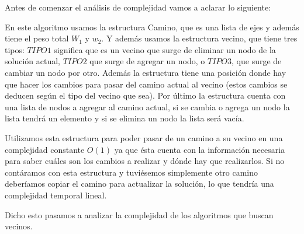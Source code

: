 Antes de comenzar el análisis de complejidad vamos a aclarar lo siguiente:

En este algoritmo usamos la estructura Camino, que es una lista de ejes y además tiene el peso total $W_1$ y $w_2$. Y además usamos la estructura vecino, que tiene tres tipos: $TIPO1$ significa que es un vecino que surge de eliminar un nodo de la solución actual, $TIPO2$ que surge de agregar un nodo, o $TIPO3$, que surge de cambiar un nodo por otro. Además la estructura tiene una posición donde hay que hacer los cambios para pasar del camino actual al vecino (estos cambios se deducen según el tipo del vecino que sea). Por último la estructura cuenta con una lista de nodos a agregar al camino actual, si se cambia o agrega un nodo la lista tendrá un elemento y si se elimina un nodo la lista será vacía.

Utilizamos esta estructura para poder pasar de un camino a su vecino en una complejidad constante $O(1)$ ya que ésta cuenta con la información necesaria para saber cuáles son los cambios a realizar y dónde hay que realizarlos. Si no contáramos con esta estructura y tuviésemos simplemente otro camino deberíamos copiar el camino para actualizar la solución, lo que tendría una complejidad temporal lineal.

Dicho esto pasamos a analizar la complejidad de los algoritmos que buscan vecinos.

